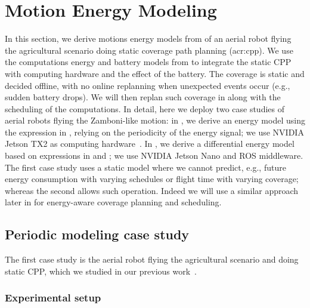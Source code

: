 \section{Motion Energy Modeling}
\label{sec:res-ene-mot}

In this section, we derive motions energy models from  of an aerial robot flying the agricultural scenario doing static coverage path planning (\Gls{acr:cpp}). We use the computations energy and battery models from  to integrate the static CPP with computing hardware and the effect of the battery. The coverage is static and decided offline, with no online replanning when unexpected events occur (e.g., sudden battery drops). We will then replan such coverage in  along with the scheduling of the computations. In detail, here we deploy two case studies of aerial robots flying the Zamboni-like motion: in , we derive an energy model using the expression in , relying on the periodicity of the energy signal; we use NVIDIA Jetson TX2 as computing hardware~\citep{seewald2020mechanical}. In , we derive a differential energy model based on expressions in  and ; we use NVIDIA Jetson Nano and ROS middleware. The first case study uses a static model where we cannot predict, e.g., future energy consumption with varying schedules or flight time with varying coverage; whereas the second allows such operation. Indeed we will use a similar approach later in  for energy-aware coverage planning and scheduling.

\subsection{Periodic modeling case study}
\label{sec:res-perio}

The first case study is the aerial robot flying the agricultural scenario and doing static CPP, which we studied in our previous work~\citep{seewald2020mechanical}. 

\subsubsection*{Experimental setup}

